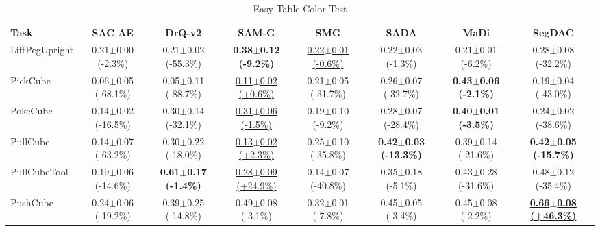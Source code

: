 \begin{table}[htbp]
\centering
\scriptsize
\caption{Easy Table Color Test}
\label{tab:appendix_tablecolortest_easy}
\begin{adjustbox}{max width=\textwidth}
\begin{tabular}{l*{7}{c}}
\toprule
\textbf{Task} & \textbf{SAC AE} & \textbf{DrQ-v2} & \textbf{SAM-G} & \textbf{SMG} & \textbf{SADA} & \textbf{MaDi} & \textbf{SegDAC} \\
\midrule
LiftPegUpright & 0.21$\pm$0.00 \scriptsize{(-2.3\%)} & 0.21$\pm$0.02 \scriptsize{(-55.3\%)} & \textbf{0.38$\pm$0.12 \scriptsize{(-9.2\%)}} & \underline{0.22$\pm$0.01 \scriptsize{(-0.6\%)}} & 0.22$\pm$0.03 \scriptsize{(-1.3\%)} & 0.21$\pm$0.01 \scriptsize{(-6.2\%)} & 0.28$\pm$0.08 \scriptsize{(-32.2\%)} \\
PickCube & 0.06$\pm$0.05 \scriptsize{(-68.1\%)} & 0.05$\pm$0.11 \scriptsize{(-88.7\%)} & \underline{0.11$\pm$0.02 \scriptsize{(+0.6\%)}} & 0.21$\pm$0.05 \scriptsize{(-31.7\%)} & 0.26$\pm$0.07 \scriptsize{(-32.7\%)} & \textbf{0.43$\pm$0.06 \scriptsize{(-2.1\%)}} & 0.19$\pm$0.04 \scriptsize{(-43.0\%)} \\
PokeCube & 0.14$\pm$0.02 \scriptsize{(-16.5\%)} & 0.30$\pm$0.14 \scriptsize{(-32.1\%)} & \underline{0.31$\pm$0.06 \scriptsize{(-1.5\%)}} & 0.19$\pm$0.10 \scriptsize{(-9.2\%)} & 0.28$\pm$0.07 \scriptsize{(-28.4\%)} & \textbf{0.40$\pm$0.01 \scriptsize{(-3.5\%)}} & 0.24$\pm$0.02 \scriptsize{(-38.6\%)} \\
PullCube & 0.14$\pm$0.07 \scriptsize{(-63.2\%)} & 0.30$\pm$0.22 \scriptsize{(-18.0\%)} & \underline{0.13$\pm$0.02 \scriptsize{(+2.3\%)}} & 0.25$\pm$0.10 \scriptsize{(-35.8\%)} & \textbf{0.42$\pm$0.03 \scriptsize{(-13.3\%)}} & 0.39$\pm$0.14 \scriptsize{(-21.6\%)} & \textbf{0.42$\pm$0.05 \scriptsize{(-15.7\%)}} \\
PullCubeTool & 0.19$\pm$0.06 \scriptsize{(-14.6\%)} & \textbf{0.61$\pm$0.17 \scriptsize{(-1.4\%)}} & \underline{0.28$\pm$0.09 \scriptsize{(+24.9\%)}} & 0.14$\pm$0.07 \scriptsize{(-40.8\%)} & 0.35$\pm$0.18 \scriptsize{(-5.1\%)} & 0.43$\pm$0.28 \scriptsize{(-31.6\%)} & 0.48$\pm$0.12 \scriptsize{(-35.4\%)} \\
PushCube & 0.24$\pm$0.06 \scriptsize{(-19.2\%)} & 0.39$\pm$0.25 \scriptsize{(-14.8\%)} & 0.49$\pm$0.08 \scriptsize{(-3.1\%)} & 0.32$\pm$0.01 \scriptsize{(-7.8\%)} & 0.45$\pm$0.05 \scriptsize{(-3.4\%)} & 0.45$\pm$0.08 \scriptsize{(-2.2\%)} & \textbf{\underline{0.66$\pm$0.08 \scriptsize{(+46.3\%)}}} \\

\end{tabular}
\end{adjustbox}
\end{table}
